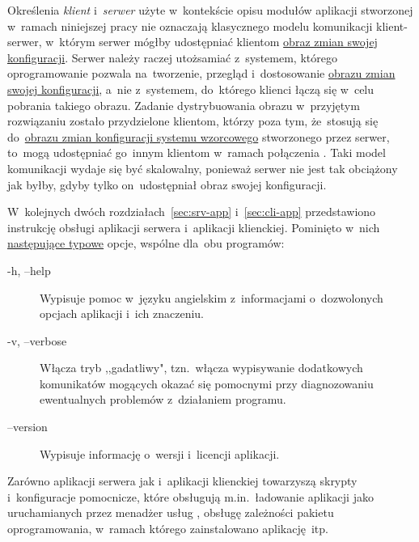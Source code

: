 \documentclass[thesis]{subfiles}
\begin{document}
Określenia \emph{klient} i~\emph{serwer} użyte w~kontekście opisu modułów aplikacji stworzonej w~ramach niniejszej pracy nie oznaczają klasycznego modelu komunikacji klient-serwer, w~którym serwer mógłby udostępniać klientom \hyperref[sec:obraz-zmian-konfiguracji]{obraz zmian swojej konfiguracji}. Serwer należy raczej utożsamiać z~systemem, którego oprogramowanie pozwala na~tworzenie, przegląd i~dostosowanie \hyperref[sec:obraz-zmian-konfiguracji]{obrazu zmian swojej konfiguracji}, a~nie z~systemem, do~którego klienci łączą się w~celu pobrania takiego obrazu. Zadanie dystrybuowania obrazu w~przyjętym rozwiązaniu zostało przydzielone klientom, którzy poza tym, że~stosują się do~\hyperref[sec:obraz-zmian-konfiguracji]{obrazu zmian konfiguracji systemu wzorcowego} stworzonego przez serwer, to~mogą udostępniać go~innym klientom w~ramach połączenia . Taki model komunikacji wydaje się być skalowalny, ponieważ serwer nie jest tak obciążony jak byłby, gdyby tylko on~udostępniał obraz swojej konfiguracji.

W~kolejnych dwóch rozdziałach~\ref{sec:srv-app} i~\ref{sec:cli-app} przedstawiono instrukcję obsługi aplikacji serwera i~aplikacji klienckiej. Pominięto w~nich \href{https://www.gnu.org/prep/standards/html_node/Command_002dLine-Interfaces.html}{następujące typowe} opcje, wspólne dla~obu programów:

\begin{description}
	\item[-h, --help] Wypisuje pomoc w~języku angielskim z~informacjami o~dozwolonych opcjach aplikacji i~ich znaczeniu.
	\item[-v, --verbose] Włącza tryb ,,gadatliwy", tzn.~włącza wypisywanie dodatkowych komunikatów mogących okazać się pomocnymi przy diagnozowaniu ewentualnych problemów z~działaniem programu.
	\item[--version] Wypisuje informację o~wersji i~licencji aplikacji.
\end{description}

Zarówno aplikacji serwera jak i~aplikacji klienckiej towarzyszą skrypty i~konfiguracje pomocnicze, które obsługują m.in.~ładowanie aplikacji jako  uruchamianych przez menadżer usług , obsługę zależności pakietu oprogramowania, w~ramach którego zainstalowano aplikację~itp.

\end{document}
